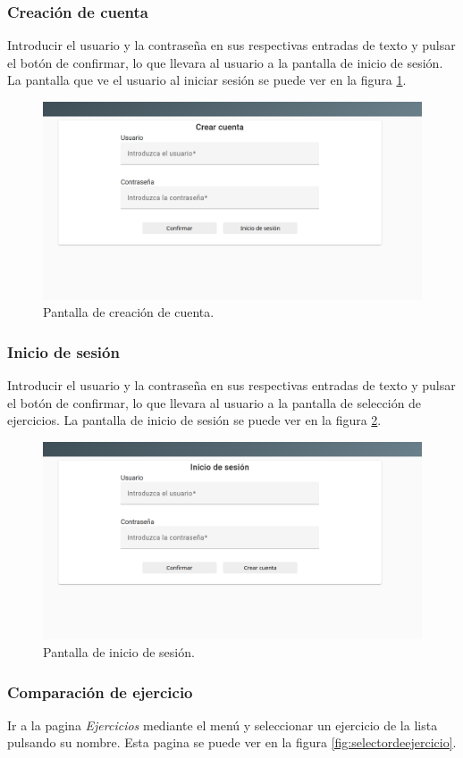 \subsubsection{Creación de cuenta}
Introducir el usuario y la contraseña en sus respectivas entradas de texto y pulsar el botón de confirmar, lo que llevara al usuario a la pantalla de inicio de sesión. La pantalla que ve el usuario al iniciar sesión se puede ver en la figura \ref{fig:crearcuenta}.
\begin{figure}
	\centering
	\includegraphics[width=0.7\linewidth]{img/ManualDeUsuario/crearCuenta}
	\caption{Pantalla de creación de cuenta.}
	\label{fig:crearcuenta}
\end{figure}


\subsubsection{Inicio de sesión}
Introducir el usuario y la contraseña en sus respectivas entradas de texto y pulsar el botón de confirmar, lo que llevara al usuario a la pantalla de selección de ejercicios. La pantalla de inicio de sesión se puede ver en la figura \ref{fig:iniciodesesion}. 

\begin{figure}
	\centering
	\includegraphics[width=0.7\linewidth]{img/ManualDeUsuario/inicioDeSesion}
	\caption{Pantalla de inicio de sesión.}
	\label{fig:iniciodesesion}
\end{figure}


\subsubsection{Comparación de ejercicio} 
Ir a la pagina \textit{Ejercicios} mediante el menú y seleccionar un ejercicio de la lista pulsando su nombre. Esta pagina se puede ver en la figura \ref{fig:selectordeejercicio}.

